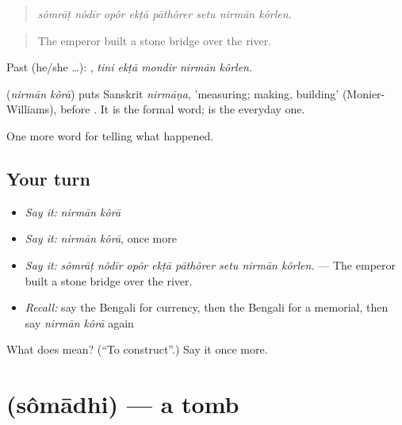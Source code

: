 \begin{quote}
       
\end{quote}

\begin{quote}
\emph{sômrāṭ nôdīr opôr ekṭā pāthôrer setu nirmān kôrlen.}
\end{quote}

\begin{quote}
The emperor built a stone bridge over the river.
\end{quote}

Past (he/she …):     , \emph{tini ekṭā mondir nirmān kôrlen}.

\begin{cousinweb}
\textbf{ } (\emph{nirmān kôrā}) puts Sanskrit \emph{nirmāṇa}, 'measuring; making, building' (Monier-Williams), before . It is the formal word; \textbf{} is the everyday one.
\end{cousinweb}

\begin{grammarlens}[title={What you've built}]
One more word for telling what happened.
\end{grammarlens}

\subsection*{Your turn}
\begin{itemize}
\raggedright
  \item \emph{Say it:} \emph{nirmān kôrā}
  \item \emph{Say it:} \emph{nirmān kôrā}, once more
  \item \emph{Say it:} \emph{sômrāṭ nôdīr opôr ekṭā pāthôrer setu nirmān kôrlen.} — The emperor built a stone bridge over the river.
  \item \emph{Recall:} say the Bengali for currency, then the Bengali for a memorial, then say \emph{nirmān kôrā} again
\end{itemize}

\begin{tcolorbox}[breakable,colback=teal!4,colframe=teal!35!black,title={Before you move on}]
What does   mean? (\textquotedblleft{}To construct\textquotedblright{}.) Say it once more.
\end{tcolorbox}
\section[\texorpdfstring{\bn{সমাধি} (sômādhi)}{সমাধি (sômādhi)}]{ (sômādhi) — a tomb}

